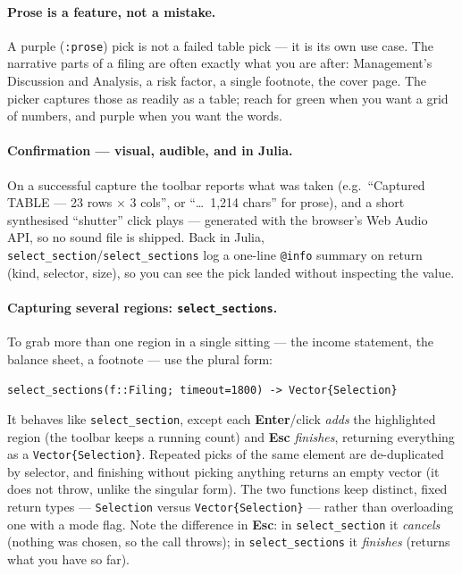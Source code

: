 \documentclass[11pt,a4paper]{report}
\newcommand{\sig}[1]{\medskip\noindent\texttt{#1}\par\medskip}
\begin{document}
\paragraph{Prose is a feature, not a mistake.} A purple (\texttt{:prose}) pick is not
a failed table pick --- it is its own use case. The narrative parts of a filing are
often exactly what you are after: Management's Discussion and Analysis, a risk factor,
a single footnote, the cover page. The picker captures those as readily as a table;
reach for green when you want a grid of numbers, and purple when you want the words.

\paragraph{Confirmation --- visual, audible, and in Julia.} On a successful capture the
toolbar reports what was taken (e.g.\ ``Captured TABLE --- 23 rows $\times$ 3 cols'', or
``\ldots\ 1{,}214 chars'' for prose), and a short synthesised ``shutter'' click plays ---
generated with the browser's Web Audio API, so no sound file is shipped. Back in Julia,
\texttt{select\_section}/\texttt{select\_sections} log a one-line \texttt{@info} summary on
return (kind, selector, size), so you can see the pick landed without inspecting the value.

\paragraph{Capturing several regions: \texttt{select\_sections}.} To grab more than one
region in a single sitting --- the income statement, the balance sheet, a footnote --- use
the plural form:

\sig{select\_sections(f::Filing; timeout=1800) -> Vector\{Selection\}}

\noindent It behaves like \texttt{select\_section}, except each \textbf{Enter}/click
\emph{adds} the highlighted region (the toolbar keeps a running count) and \textbf{Esc}
\emph{finishes}, returning everything as a \texttt{Vector\{Selection\}}. Repeated picks of
the same element are de-duplicated by selector, and finishing without picking anything
returns an empty vector (it does not throw, unlike the singular form). The two functions
keep distinct, fixed return types --- \texttt{Selection} versus \texttt{Vector\{Selection\}}
--- rather than overloading one with a mode flag. Note the difference in \textbf{Esc}: in
\texttt{select\_section} it \emph{cancels} (nothing was chosen, so the call throws); in
\texttt{select\_sections} it \emph{finishes} (returns what you have so far).
\end{document}
